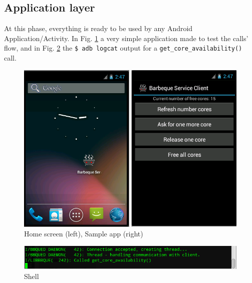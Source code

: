 \subsection{Application layer}
At this phase, everything is ready to be used by any Android Application/Activity. In Fig. \ref{fig:screenshot} a very simple application made to test the calls' flow, and in Fig. \ref{fig:shell} the \texttt{\$ adb logcat} output for a \texttt{get\_core\_availability()} call.
\begin{figure}[!htb]
	\centering
	\includegraphics[scale=.505]{images/screenshot_duo.png}
	\caption{Home screen (left), Sample app (right)}
	\label{fig:screenshot}
\end{figure}
\begin{figure}[!htb]
	\centering
	\includegraphics[scale=.505]{images/shell.png}
	\caption{Shell}
	\label{fig:shell}
\end{figure}